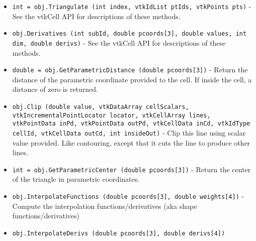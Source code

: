 \begin{itemize}
\item  \verb|int = obj.Triangulate (int index, vtkIdList ptIds, vtkPoints pts)| -  See the vtkCell API for descriptions of these methods.

\item  \verb|obj.Derivatives (int subId, double pcoords[3], double values, int dim, double derivs)| -  See the vtkCell API for descriptions of these methods.

\item  \verb|double = obj.GetParametricDistance (double pcoords[3])| -  Return the distance of the parametric coordinate provided to the
 cell. If inside the cell, a distance of zero is returned.

\item  \verb|obj.Clip (double value, vtkDataArray cellScalars, vtkIncrementalPointLocator locator, vtkCellArray lines, vtkPointData inPd, vtkPointData outPd, vtkCellData inCd, vtkIdType cellId, vtkCellData outCd, int insideOut)| -  Clip this line using scalar value provided. Like contouring, except
 that it cuts the line to produce other lines.

\item  \verb|int = obj.GetParametricCenter (double pcoords[3])| -  Return the center of the triangle in parametric coordinates.

\item  \verb|obj.InterpolateFunctions (double pcoords[3], double weights[4])| -  Compute the interpolation functions/derivatives
 (aka shape functions/derivatives)

\item  \verb|obj.InterpolateDerivs (double pcoords[3], double derivs[4])|

\end{itemize}
